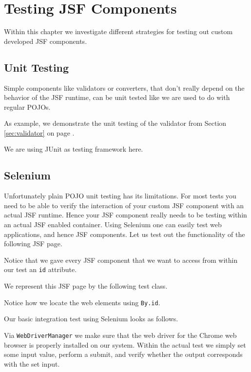 %

\chapter{Testing JSF Components}
Within this chapter we investigate different strategies for testing out custom developed JSF components.

\section{Unit Testing}
Simple components like validators or converters, that don't really depend on the behavior of the JSF runtime, can be unit tested like we are used to do with regular POJOs.

As example, we demonstrate the unit testing of the validator from Section \ref{sec:validator}  on page \pageref{sec:validator}.

We are using JUnit \cite{junit5} as testing framework here.


\section{Selenium}
Unfortunately plain POJO unit testing has its limitations.
For most tests you  need to be able to verify the interaction of your custom JSF component with an actual JSF runtime.
Hence your JSF component really needs to be testing within an actual JSF enabled container.
Using Selenium \cite{selenium} one can easily test web applications, and hence JSF components.
Let us test out the functionality of the following JSF page.

Notice that we gave every JSF component that we want to access from within our test an \texttt{id} attribute.

We represent this JSF page by the following test class.

Notice how we locate the web elements using \texttt{By.id}.

Our basic integration test using Selenium looks as follows.

Via \texttt{WebDriverManager} we make sure that the web driver \cite{webdriver} for the Chrome web browser is properly installed on our system.
Within the actual test we simply set some input value, perform a submit, and verify whether the output corresponds with the set input.

